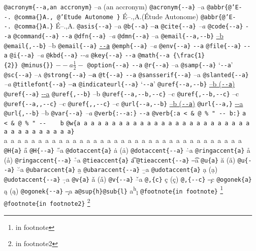 \documentclass{book}
\newcommand\Texinfocommandstyletextcite[1]{{\normalfont{}\textsl{#1}}}%
\newcommand\Texinfocommandstyletextkbd[1]{{\ttfamily\textsl{#1}}}%
\newcommand\Texinfocommandstyletextvar[1]{{\normalfont{}\textsl{#1}}}%
\renewcommand{\_}{\Texinfounderscore\discretionary{}{}{}}
\begin{document}
\texttt{@acronym\{{-}{-}a,an accronym\}} --a (an accronym)
\texttt{@acronym\{{-}{-}a\}} --a
\texttt{@abbr\{@'E{-}{-}.\ @comma\{\}A.,\ @'Etude Autonome \}} \'{E}--.\@ ,A.\@ (\'{E}tude Autonome)
\texttt{@abbr\{@'E{-}{-}.\ @comma\{\}A.\}} \'{E}--.\@ ,A.\@
\texttt{@asis\{{-}{-}a\}} --a
\texttt{@b\{{-}{-}a\}} \textbf{--a}
\texttt{@cite\{{-}{-}a\}} \Texinfocommandstyletextcite{--a}
\texttt{@code\{{-}{-}a\}} \texttt{{-}{-}a}
\texttt{@command\{{-}{-}a\}} \texttt{{-}{-}a}
\texttt{@dfn\{{-}{-}a\}} \textsl{--a}
\texttt{@dmn\{{-}{-}a\}} \thinspace --a
\texttt{@email\{{-}{-}a,{-}{-}b\}} \href{mailto:--a}{--b}
\texttt{@email\{,{-}{-}b\}} --b
\texttt{@email\{{-}{-}a\}} \href{mailto:--a}{\nolinkurl{--a}}
\texttt{@emph\{{-}{-}a\}} \emph{--a}
\texttt{@env\{{-}{-}a\}} \texttt{{-}{-}a}
\texttt{@file\{{-}{-}a\}} \texttt{{-}{-}a}
\texttt{@i\{{-}{-}a\}} \textit{--a}
\texttt{@kbd\{{-}{-}a\}} \Texinfocommandstyletextkbd{{-}{-}a}
\texttt{@key\{{-}{-}a\}} \texttt{{-}{-}a}
\texttt{@math\{{-}{-}a \{\textbackslash{}frac\{1\}\{2\}\}\ @minus\{\}\}} $--a {\frac{1}{2}} -$
\texttt{@option\{{-}{-}a\}} \texttt{{-}{-}a}
\texttt{@r\{{-}{-}a\}} \textnormal{--a}
\texttt{@samp\{{-}{-}a\}} `\texttt{{-}{-}a}'
\texttt{@sc\{{-}{-}a\}} \textsc{--a}
\texttt{@strong\{{-}{-}a\}} \textbf{--a}
\texttt{@t\{{-}{-}a\}} \texttt{{-}{-}a}
\texttt{@sansserif\{{-}{-}a\}} \textsf{--a}
\texttt{@slanted\{{-}{-}a\}} \textsl{--a}
\texttt{@titlefont\{{-}{-}a\}} {\huge \bfseries --a}
\texttt{@indicateurl\{{-}{-}a\}} `\texttt{{-}{-}a}'
\texttt{@uref\{{-}{-}a,{-}{-}b\}} \href{--a}{--b (\nolinkurl{--a})}
\texttt{@uref\{{-}{-}a\}} \url{--a}
\texttt{@uref\{,{-}{-}b\}} --b
\texttt{@uref\{{-}{-}a,{-}{-}b,{-}{-}c\}} --c
\texttt{@uref\{,{-}{-}b,{-}{-}c\}} --c
\texttt{@uref\{{-}{-}a{,}{,}{-}{-}c\}} --c
\texttt{@uref\{{,}{,}{-}{-}c\}} --c
\texttt{@url\{{-}{-}a,{-}{-}b\}} \href{--a}{--b (\nolinkurl{--a})}
\texttt{@url\{{-}{-}a,\}} \url{--a}
\texttt{@url\{,{-}{-}b\}} --b
\texttt{@var\{{-}{-}a\}} \Texinfocommandstyletextvar{--a}
\texttt{@verb\{:{-}{-}a:\}} \verb:--a:
\texttt{@verb\{:a  < \& @\ \% " {-}{-}    b:\}} \verb:a  < & @ % " --    b:
\texttt{@w\{a a a a a a a a a a a a a a a a a a a a a a a a a a a a a a a a a a a\}} \hbox{a a a a a a a a a a a a a a a a a a a a a a a a a a a a a a a a a a a}
\texttt{@H\{a\}} \H{a}
\texttt{@H\{{-}{-}a\}} \H{--a}
\texttt{@dotaccent\{a\}} \.{a} (ȧ)
\texttt{@dotaccent\{{-}{-}a\}} \.{--a}
\texttt{@ringaccent\{a\}} \r{a} (å)
\texttt{@ringaccent\{{-}{-}a\}} \r{--a}
\texttt{@tieaccent\{a\}} \t{a}
\texttt{@tieaccent\{{-}{-}a\}} \t{--a}
\texttt{@u\{a\}} \u{a} (ă)
\texttt{@u\{{-}{-}a\}} \u{--a}
\texttt{@ubaraccent\{a\}} \b{a}
\texttt{@ubaraccent\{{-}{-}a\}} \b{--a}
\texttt{@udotaccent\{a\}} \d{a} (ạ)
\texttt{@udotaccent\{{-}{-}a\}} \d{--a}
\texttt{@v\{a\}} \v{a} (ǎ)
\texttt{@v\{{-}{-}a\}} \v{--a}
\texttt{@,\{c\}} \c{c} (ç)
\texttt{@,\{{-}{-}c\}} \c{--c}
\texttt{@ogonek\{a\}} \k{a} (ą)
\texttt{@ogonek\{{-}{-}a\}} \k{--a}
\texttt{a@sup\{h\}@sub\{l\}} a\textsuperscript{h}\textsubscript{l}
\texttt{@footnote\{in footnote\}} \footnote{in footnote}
\texttt{@footnote\{in footnote2\}} \footnote{in footnote2}
\end{document}
